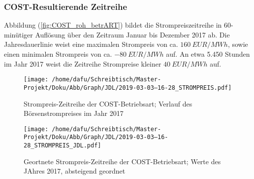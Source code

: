 \documentclass[onecolumn,10pt,titlepage]{article}
\begin{document}
\subsubsection{COST-Resultierende Zeitreihe}
Abbildung (\ref{fig:COST_roh_betrART}) bildet die Strompreiszeitreihe in 60-minütiger Auflösung über den Zeitraum Januar bis Dezember 2017 ab. Die Jahresdauerlinie weist eine maximalen Strompreis von  ca. $160~ EUR/MWh$, sowie einen minimalen Strompreis von ca. $-80 ~EUR/MWh$ auf. An etwa 5.450 Stunden im Jahr 2017 weist die Zeitreihe Strompreise kleiner $40 ~EUR/MWh$ auf. \\

\begin{figure}[H]
	\centering
	\begin{minipage}[t]{0.49\textwidth}
		\texttt{[image: /home/dafu/Schreibtisch/Master-Projekt/Doku/Abb/Graph/JDL/2019-03-03--16-28\_STROMPREIS.pdf]}

		\caption[Strompreis-Zeitreihe der COST-Betriebsart]{Strompreis-Zeitreihe der COST-Betriebsart; Verlauf des Börsenstrompreises im Jahr 2017}
		\label{fig:COST_roh_betrART}
	\end{minipage}
	\hfill
	\begin{minipage}[t]{0.49\textwidth}
		\texttt{[image: /home/dafu/Schreibtisch/Master-Projekt/Doku/Abb/Graph/JDL/2019-03-03--16-28\_STROMPREIS\_JDL.pdf]}
		\caption[Geortnete Strompreis-Zeitreihe der COST-Betriebsart]{Geortnete Strompreis-Zeitreihe der COST-Betriebsart; Werte des JAhres 2017, absteigend geordnet}
		\label{fig:COST_JDL_betrART}
	\end{minipage}
\end{figure}
%


\end{document}
